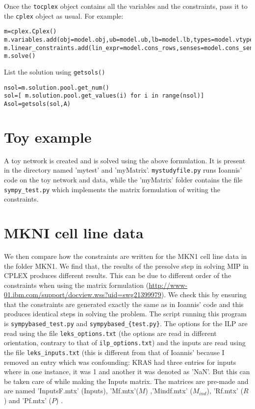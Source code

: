 \documentclass[
10pt, %
letter, %
oneside, %
BCOR02mm, %
]{scrartcl}
\begin{document}
Once the \verb;tocplex; object contains all the variables and the constraints, pass it to the \verb;cplex; object as usual. For example:
\begin{verbatim}
m=cplex.Cplex()
m.variables.add(obj=model.obj,ub=model.ub,lb=model.lb,types=model.vtypes,names=model.names)
m.linear_constraints.add(lin_expr=model.cons_rows,senses=model.cons_senses,rhs=model.cons_rhs)
m.solve()
\end{verbatim}
List the solution using \verb;getsols();
\begin{verbatim}
nsol=m.solution.pool.get_num()
sol=[ m.solution.pool.get_values(i) for i in range(nsol)]
Asol=getsols(sol,A)
\end{verbatim}
\section{Toy example}
A toy network is created and is solved using the above formulation. It is present in the directory named 'mytest' and 'myMatrix'. \verb;mystudyfile.py; runs Ioannis' code on the toy network and data, while the 'myMatrix' folder contains the file \verb;sympy_test.py; which implements the matrix formulation of writing the constraints. 

\section{MKNI cell line data}
We then compare how the constraints are written for the MKN1 cell line data in the folder MKN1. We find that, the results of the presolve step in solving MIP in CPLEX produces different results. This can be due to different order of the constraints when using the matrix formulation (\url{http://www-01.ibm.com/support/docview.wss?uid=swg21399979}). We check this by ensuring that the constraints are generated exactly the same as in Ioannis' code and this produces identical steps in solving the problem.  The script running this program is \verb;sympybased_test.py; and \verb;sympybased_{test.py};. The options for the ILP are read using the file \verb;leks_options.txt; (the options are read in different orientation, contrary to that of \verb;ilp_options.txt;) and the inputs are read using the file \verb;leks_inputs.txt; (this is different from that of Ioannis' because I removed an entry which was confounding: KRAS had three entries for inputs where in one instance, it was 1 and another it was denoted as 'NaN'. But this can be taken care of while making the Inputs matrix. The matrices are pre-made and are named 'InputsF.mtx' (Inputs), 'Mf.mtx'($M$) ,'Mindf.mtx' ($M_{ind}$), 'Rf.mtx' ($R$) and 'Pf.mtx' ($P$) .
\end{document}
